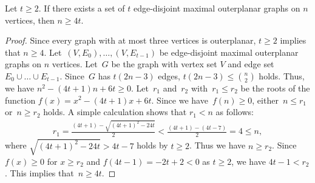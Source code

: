 \documentclass[10pt,a4paper]{amsart}
\begin{document}
	\begin{lemma}
		\label{lem:lower-bound}
		Let $t \ge 2$. If there exists a set of \(t\) edge-disjoint maximal outerplanar graphs on \(n\) vertices, then \(n\geq 4t\).
	\end{lemma}

	\begin{proof}
		Since every graph with at most three vertices is outerplanar, $t \ge 2$ implies that $n \ge 4$.
		Let~\((V,E_0), \dots, (V,E_{t-1})\) be edge-disjoint maximal outerplanar graphs on \(n\) vertices.
		Let~\(G\) be the graph with vertex set \(V\) and edge set \(E_0 \cup \dots \cup E_{t-1}\). 
		Since~\(G\) has \(t(2n-3)\) edges, \(t(2n-3) \le \binom{n}{2}\) holds. Thus, we have $n^{2} - (4t+1)n + 6t \ge 0$.
		Let~$r_{1}$ and~$r_{2}$ with~$r_{1} \le r_{2}$ be the roots of the function $f(x) = x^{2} - (4t+1)x + 6t$.
		Since we have~$f(n) \ge 0$, either~$n \le r_{1}$ or~$n \ge r_{2}$ holds.
		A simple calculation shows that $r_{1} < n$ as follows:
		\begin{align*}
			r_{1}
			=
			\frac{(4t+1) - \sqrt{(4t+1)^{2} - 24t}}{2}
			<
			\frac{(4t+1) - (4t-7)}{2}
			=
			4
			\le n,
		\end{align*}
		where $\sqrt{(4t+1)^{2} - 24t} > 4t - 7$ holds by $t \ge 2$.
		Thus we have $n \ge r_{2}$. Since $f(x) \ge 0$ for $x \ge r_{2}$ and $f(4t-1) = -2t+2 < 0$ as $t \ge 2$, we have $4t-1 < r_{2}$.
		This implies that~$n \ge 4t$.
	\end{proof}
\end{document}
